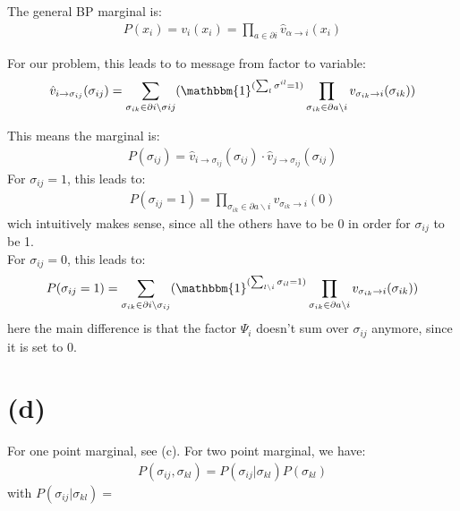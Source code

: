 \documentclass[a4paper]{scrartcl}
\begin{document}
The general BP marginal is:
\begin{align}
    P(x_i) = v_i(x_i) = \prod_{a \in \partial i} \hat{v}_{\alpha \rightarrow i}(x_i)
\end{align}

For our problem, this leads to to message from factor to variable:
\begin{align}
    \hat{v}_{i \rightarrow \sigma_{ij}}(\sigma_{ij}) &= \sum_{\sigma_{ik} \in \partial i \backslash \sigma{ij}} (\mathbbm{1}^{(\sum_l \sigma^{il} = 1)} \prod_{\sigma_{ik} \in \partial a \backslash i} v_{\sigma_{ik} \rightarrow i}(\sigma_{ik}))\\
\end{align}

This means the marginal is:
\begin{align}
    P(\sigma_{ij}) = \hat{v}_{i \rightarrow \sigma_{ij}}(\sigma_{ij}) \cdot \hat{v}_{j \rightarrow \sigma_{ij}}(\sigma_{ij})
\end{align}
For $\sigma_{ij}=1$, this leads to:
\begin{align}
    P(\sigma_{ij}=1) =  \prod_{\sigma_{ik} \in \partial a \backslash i} v_{\sigma_{ik} \rightarrow i}(0)
\end{align}
wich intuitively makes sense, since all the others have to be 0 in order for $\sigma_{ij}$ to be 1.\\
For $\sigma_{ij}=0$, this leads to:
\begin{align}
    P(\sigma_{ij}=1) = \sum_{\sigma_{ik} \in \partial i \backslash \sigma_{ij}} (\mathbbm{1}^{(\sum_{l \backslash i} \sigma_{il} = 1)} \prod_{\sigma_{ik} \in \partial a \backslash i} v_{\sigma_{ik} \rightarrow i}(\sigma_{ik}))\\
\end{align}
here the main difference is that the factor $\Psi_{i}$ doesn't sum over $\sigma_{ij}$ anymore, since it is set to 0.

\section*{(d)}
For one point marginal, see (c). For two point marginal, we have:
\begin{align}
    P(\sigma_{ij}, \sigma_{kl}) = P(\sigma_{ij} \vert \sigma_{kl}) P(\sigma_{kl})
\end{align}
with $P(\sigma_{ij} \vert \sigma_{kl}) = $
\end{document}
